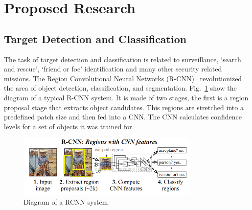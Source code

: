 \documentclass{article} %
\begin{document}
\section{Proposed Research}

\subsection{Target Detection and Classification}

The task of target detection and classification is related
to surveillance, `search and rescue', `friend or foe' identification and many other security related missions. 
The Region Convolutional Neural Networks
(R-CNN)~\cite{Girshick2014} revolutionized the area of object detection, classification, and segmentation. Fig.~\ref{fig:RCNN} show the diagram of a typical
R-CNN system. It is made of two stages, the first is a region proposal stage that extracts
object candidates. This regions are stretched into a predefined patch size and then
fed into a CNN. The CNN calculates confidence levels for a set of objects it was trained
for.
\begin{figure}[h]
	\centering
	\includegraphics[width=0.8\textwidth]{RCNN}
	\caption{Diagram of a RCNN system}
	\label{fig:RCNN}
\end{figure}
\end{document}
